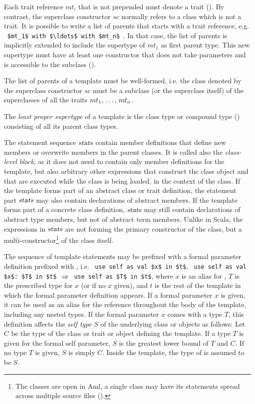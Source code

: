 Each trait reference $mt_i$ that is not prepended must denote a trait (). By contrast, the superclass constructor $sc$ normally refers to a class which is not a trait. It is possible to write a list of parents that starts with a trait reference, e.g. ~\lstinline!$mt_1$ with $\ldots$ with $mt_n$!~. In that case, the list of parents is implicitly extended to include the supertype of $mt_1$ as first parent type. This new supertype must have at least one constructor that does not take parameters and is accessible to the subclass (). 

The list of parents of a template must be well-formed, i.e. the class denoted by the superclass constructor $sc$ must be a subclass (or the superclass itself) of the superclasses of all the traits $mt_1 ,\, \ldots ,\, mt_n$. 

The {\em least proper supertype} of a template is the class type or compound type () consisting of all its parent class types. 

The statement sequence $\mbox{\sl stats}$ contain member definitions that define new members or overwrite members in the parent classes. It is called also the {\em class-level block}, as it does not need to contain only member definitions for the template, but also arbitrary other expressions that construct the class object and that are executed while the class is being loaded, in the context of the class. If the template forms part of an abstract class or trait definition, the statement part $\mbox{\sl stats}$ may also contain declarations of abstract members. If the template forms part of a concrete class definition, $\mbox{\sl stats}$ may still contain declarations of abstract type members, but not of abstract term members. Unlike in Scala, the expressions in $\mbox{\sl stats}$ are not forming the primary constructor of the class, but a multi-constructor\footnote{The classes are open in Aml, a single class may have its statements spread across multiple source files ().} of the class itself. 

The sequence of template statements may be prefixed with a formal parameter definition prefixed with , i.e. ~\lstinline!use self as val $x$ in $t$!, ~\lstinline!use self as val $x$: $T$ in $t$!~ or ~\lstinline!use self as $T$ in $t$!, where $x$ is an alias for , $T$ is the prescribed type for $x$ (or  if no $x$ given), and $t$ is the rest of the template in which the formal parameter definition appears. If a formal parameter $x$ is given, it can be used as an alias for the reference  throughout the body of the template, including any nested types. If the formal parameter $x$ comes with a type $T$, this definition affects the {\em self type} $S$ of the underlying class or objects as follows: Let $C$ be the type of the class or trait or object defining the template. If a type $T$ is given for the formal self parameter, $S$ is the greatest lower bound of $T$ and $C$. If no type $T$ is given, $S$ is simply $C$. Inside the template, the type of  is assumed to be $S$. 

